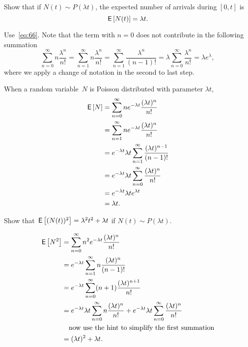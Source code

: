 \begin{exercise} 
 Show that if $N(t)\sim P(\lambda t)$, the expected number of arrivals during $[0,t]$ is
 \begin{equation*}
 \,\mathsf{E}\left[N(t)\right] = \lambda t.
 \end{equation*}
\begin{hint}
Use~\cref{eq:66}. Note that the term with $n=0$ does not contribute in the following summation
\begin{equation*}
\sum_{n=0}^\infty n \frac{\lambda^n}{n!} = \sum_{n=1}^\infty n \frac{\lambda^n}{n!} = \sum_{n=1}^\infty \frac{\lambda^n}{(n-1)!} = \lambda \sum_{n=0}^\infty \frac{\lambda^n}{n!} = \lambda e^{\lambda},
\end{equation*}
where we apply a change of notation in the second to last step.
\end{hint}
\begin{solution} 
 When a random variable~$N$ is Poisson distributed with parameter
 $\lambda t$,
 \begin{align*}
 \,\mathsf{E}\left[N\right] 
&= \sum_{n=0}^\infty n e^{-\lambda t}\frac{(\lambda t)^n}{n!} \\
&= \sum_{n=1}^\infty n e^{-\lambda t}\frac{(\lambda t)^n}{n!} \\ 
&= e^{-\lambda t} \lambda t \sum_{n=1}^\infty \frac{(\lambda t)^{n-1}}{(n-1)!} \\
&= e^{-\lambda t} \lambda t \sum_{n=0}^\infty \frac{(\lambda t)^{n}}{n!} \\
&= e^{-\lambda t} \lambda t e^{\lambda t} \\
&= \lambda t.
 \end{align*}
\end{solution}
\end{exercise}

\begin{exercise}
 Show that $\,\mathsf{E}\left[(N(t))^2\right] = \lambda^2 t^2 + \lambda t$ if  $N(t)\sim P(\lambda t)$.
\begin{solution}
 \begin{align*}
 \,\mathsf{E}\left[N^2\right]
&= \sum_{n=0}^\infty n^2 e^{-\lambda t}\frac{(\lambda t)^n}{n!} \\
&= e^{-\lambda t} \sum_{n=1}^\infty n \frac{(\lambda t)^n}{(n-1)!} \\
&= e^{-\lambda t} \sum_{n=0}^\infty (n+1) \frac{(\lambda t)^{n+1}}{n!} \\
&= e^{-\lambda t} \lambda t \sum_{n=0}^\infty n \frac{(\lambda t)^{n}}{n!} +e^{-\lambda t}\lambda t \sum_{n=0}^\infty\frac{(\lambda t)^{n}}{n!} \\
&\quad\text{now use the hint to simplify the first summation} \\
&= (\lambda t)^2 + \lambda t.
\end{align*}
\end{solution}
\end{exercise}

